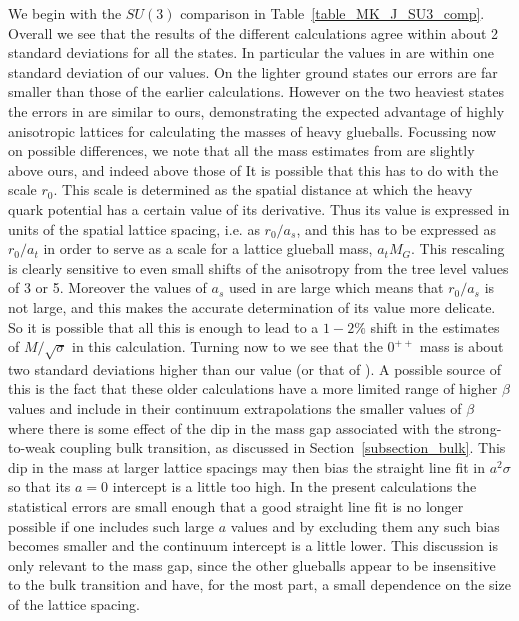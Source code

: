\documentclass[12pt]{article}
\begin{document}
We begin with the $SU(3)$ comparison in Table~\ref{table_MK_J_SU3_comp}. Overall we see
that the results of the different calculations agree within about 2 standard deviations for
all the states. In particular the values in 
%
\cite{HM_Thesis}
%
are within one standard deviation of our values. On the lighter ground states our errors
are far smaller than those of the earlier calculations. However on the two heaviest states
the errors in
%
\cite{MP-2005}
%
are similar to ours, demonstrating the expected advantage of highly anisotropic lattices
for calculating the masses of heavy glueballs. Focussing now on possible differences,
we note that all the mass estimates from
%
\cite{MP-2005}
%
are slightly above ours, and indeed above those of
%
\cite{HM_Thesis}
%
It is possible that this has to do with the scale $r_0$. This scale is determined as the
spatial distance at which the heavy quark potential has a certain value of its derivative.
Thus its value is expressed in units of the spatial lattice spacing, i.e. as $r_0/a_s$,
and this has to be expressed as  $r_0/a_t$ in order to serve as a scale for a lattice
glueball mass, $a_tM_G$. This rescaling is clearly sensitive to even small shifts of the
anisotropy from the tree level values of 3 or 5. Moreover the values of $a_s$ used in
%
\cite{MP-2005}
%
are large which means that $r_0/a_s$ is not large, and this makes the accurate determination
of its value more delicate. So it is possible that all this is enough to lead to a $1-2\%$
shift in the estimates of $M/\surd\sigma$ in this calculation. Turning now to
%
\cite{BLMT_N,BLMTUW_N}
%
we see that the $0^{++}$ mass is about two standard deviations higher than our value
(or that of 
%
\cite{HM_Thesis}
%
).
A possible source of this is the fact that these older calculations have a more limited
range of higher $\beta$ values and include in their continuum extrapolations the smaller values
of $\beta$ where there is some effect of the dip in the mass gap associated with the
strong-to-weak coupling bulk transition, as discussed in Section~\ref{subsection_bulk}.
This dip in the mass at larger lattice spacings may then bias the straight line fit
in $a^2\sigma$ so that its $a=0$ intercept is a little too high. In the present
calculations the statistical errors are small enough that a good straight line fit
is no longer possible if one includes such large $a$ values and by excluding them any
such bias becomes smaller and the continuum intercept is a little lower. This discussion
is only relevant to the mass gap, since the other glueballs appear to be insensitive
to the bulk transition and have, for the most part, a small dependence on the
size of the lattice spacing.
\end{document}
